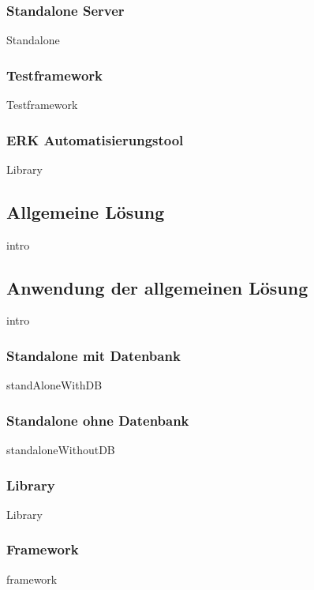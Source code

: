 \documentclass{article}
\begin{document}
        \subsubsection{Standalone Server}
            {Standalone}
        \subsubsection{Testframework}
            {Testframework}
        \subsubsection{ERK Automatisierungstool}
            {Library}
    \newpage
    \subsection{Allgemeine Lösung}
    \label{kap:commonSolution}
        {intro}

    \newpage
    \subsection{Anwendung der allgemeinen Lösung}
        {intro}
        
        \newpage
        \subsubsection{Standalone mit Datenbank}
            {standAloneWithDB}

        \newpage
        \subsubsection{Standalone ohne Datenbank}
            {standaloneWithoutDB}

        \newpage
        \subsubsection{Library}
            {Library}
        
        \newpage
        \subsubsection{Framework}
            {framework}
    
\end{document}
